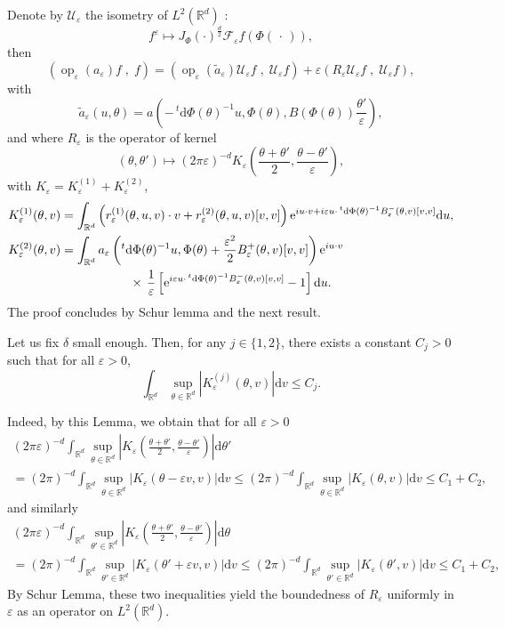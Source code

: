 \documentclass[AHL,Unicode,longabstracts]{cedram}
\DeclareMathOperator{\op}{op}
\newcommand*\R{{\mathbb R}}
\newcommand*\eps{\varepsilon}
\numberwithin{equation}{section}
\newcommand{\ee}{{\mathrm e}}
\newcommand*{\dd}{\mathrm{d}}
\newcommand*{\dv}{\dd v}
\newcommand*{\du}{\dd u}
\newcommand*{\dtheta}{\dd \theta}
\newcommand*{\dPhi}{\dd \Phi} %
\begin{document}

Denote by ${\mathcal U}_\eps$ the isometry of $L^2(\R^d)$ :
\[
f^\eps \mapsto J_\Phi(\cdot)^\frac{d}{2} {\mathcal F}_\eps f\left(\Phi\left(\,\cdot\, \right)\right),
\]
then
\[
\left(\op_\eps(a_\eps)f\;,\;f\right) = \left(\op_\eps \left(\widetilde a_\eps \right) {\mathcal U}_\eps f\;,\;{\mathcal U}_\eps f\right)+\eps\left(R_\eps {\mathcal U}_\eps f\;,\;{\mathcal U}_\eps f\right),
\]
with
\[
\widetilde a_\eps (u,\theta)= a\left(-\,^t \dPhi (\theta)^{-1} u,\Phi(\theta),B\left(\Phi(\theta)\right) \frac{\theta'}{\eps}\right),
\]
and where $R_\eps$ is the operator of kernel
\[
(\theta,\theta')\mapsto (2\pi\eps)^{-d} K_\eps \left(\frac{\theta+\theta'}{2},\frac{\theta-\theta'}{\eps}\right),
\]
with $K_\eps=K_\eps^{(1)}+K_\eps^{(2)}$,
\begin{align*}
K_\eps^{(1)}(\theta,v)&= \int_{\R^{d}} \left(r_\eps^{(1)}(\theta, u, v)\cdot v+ r_\eps^{(2)}(\theta,u,v) [v,v]\right){\ee}^{i u\cdot v +i\eps u\cdot \,^t \dPhi (\theta)^{-1} B_\eps^-(\theta,v)[v,v]} \du,\\
K_\eps^{(2)}(\theta,v) &= \int_{\R^{d}} a_\eps\left(^t \dPhi (\theta)^{-1} u,\Phi(\theta)+\frac{\eps^2}{2} B_\eps^+(\theta,v)[v,v]\right) {\ee}^{i u\cdot v} \\
&\mkern 100mu \times \,\frac{1}{\eps} \left[{\ee}^{i\eps u\cdot \,^t \dPhi (\theta)^{-1} B_\eps^-(\theta,v)[v,v]}-1 \right] \du.
\end{align*}
The proof concludes by Schur lemma and the next result.

\begin{lemm}\label{lem:estrest}
Let us fix $\delta$ small enough. Then, for any $j\in\{1,2\}$, there exists a constant $C_j>0$ such that for all $\eps>0$,
\[
\int_{\R^d} \sup_{\theta\in\R^d} |K_\eps^{(j)}(\theta,v) |\dv\leq C_j.
\]
\end{lemm}

Indeed, by this Lemma, we obtain that for all $\eps>0$
\begin{multline*}
(2\pi\eps)^{-d}\int_{\R^d} \sup_{\theta\in\R^d} \left|K_\eps \left(\frac{\theta+\theta'}{2},\frac{\theta-\theta'}{\eps}\right)\right|\dtheta'\\
= (2\pi)^{-d}\int_{\R^d} \sup_{\theta\in\R^d} |K_\eps \left(\theta-\eps v,v\right)|\dv \leq (2\pi)^{-d}\int_{\R^d} \sup_{\theta\in\R^d} |K_\eps \left(\theta,v\right)|\dv
\leq C_1+C_2,
\end{multline*}
and similarly
\begin{multline*}
(2\pi\eps)^{-d}\int_{\R^d} \sup_{\theta'\in\R^d} \left|K_\eps \left(\frac{\theta+\theta'}{2},\frac{\theta-\theta'}{\eps}\right)\right|\dtheta
\\
= (2\pi)^{-d}\int_{\R^d} \sup_{\theta'\in\R^d} |K_\eps \left(\theta'+\eps v,v\right)|\dv
\leq (2\pi)^{-d}\int_{\R^d} \sup_{\theta'\in\R^d} |K_\eps \left(\theta',v\right)|\dv
\leq C_1+C_2,
\end{multline*}
By Schur Lemma, these two inequalities yield the boundedness of $R_\eps$ uniformly in $\eps$ as an operator on $L^2(\R^d)$.
\end{document}
